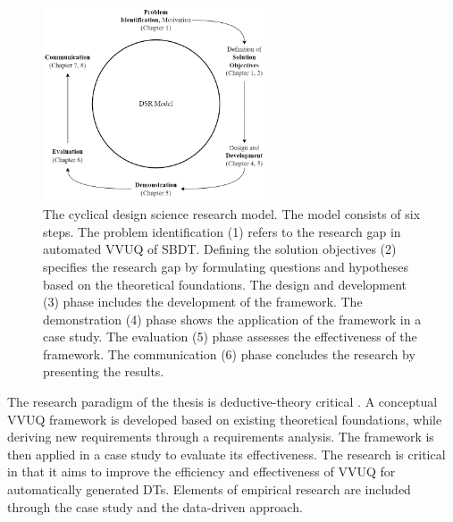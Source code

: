 \begin{figure}[H]
  \centering
  \includegraphics[width=0.6\textwidth]{figures/dsr.png}
  \caption{The cyclical design science research model. The model consists of six steps. The problem identification (1) refers to the research gap in automated VVUQ of SBDT. Defining the solution objectives (2) specifies the research gap by formulating questions and hypotheses based on the theoretical foundations. The design and development (3) phase includes the development of the framework. The demonstration (4) phase shows the application of the framework in a case study. The evaluation (5) phase assesses the effectiveness of the framework. The communication (6) phase concludes the research by presenting the results.}
  \label{fig:DSR}
\end{figure}

The research paradigm of the thesis is deductive-theory critical \autocite{eberhard1987einfuhrung}. A conceptual VVUQ framework is developed based on existing theoretical foundations, while deriving new requirements through a requirements analysis. The framework is then applied in a case study to evaluate its effectiveness. The research is critical in that it aims to improve the efficiency and effectiveness of VVUQ for automatically generated DTs. Elements of empirical research are included through the case study and the data-driven approach.

